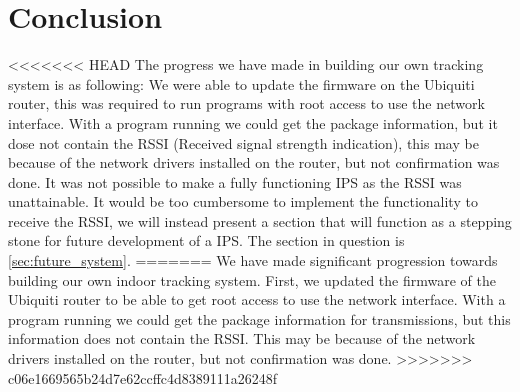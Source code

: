\section*{Conclusion}
<<<<<<< HEAD
The progress we have made in building our own tracking system is as following: We were able to update the firmware on the Ubiquiti router, this was required to run programs with root access to use the network interface. With a program running we could get the package information, but it dose not contain the RSSI (Received signal strength indication), this may be because of the network drivers installed on the router, but not confirmation was done. It was not possible to make a fully functioning IPS as the RSSI was unattainable. It would be too cumbersome to implement the functionality to receive the RSSI, we will instead present a section that will function as a stepping stone for future development of a IPS. The section in question is \cref{sec:future_system}.
=======
We have made significant progression towards building our own indoor tracking system. First, we updated the firmware of the Ubiquiti router to be able to get root access to use the network interface. With a program running we could get the package information for transmissions, but this information does not contain the RSSI. This may be because of the network drivers installed on the router, but not confirmation was done. 
>>>>>>> c06e1669565b24d7e62ccffc4d8389111a26248f
